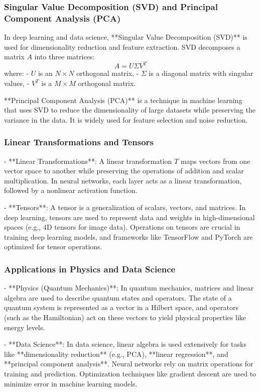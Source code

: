 \documentclass{article}
\begin{document}
\subsubsection*{Singular Value Decomposition (SVD) and Principal Component Analysis (PCA)}

In deep learning and data science, **Singular Value Decomposition (SVD)** is used for dimensionality reduction and feature extraction. SVD decomposes a matrix \( A \) into three matrices:
\[
A = U \Sigma V^T
\]
where:
- \( U \) is an \( N \times N \) orthogonal matrix,
- \( \Sigma \) is a diagonal matrix with singular values,
- \( V^T \) is a \( M \times M \) orthogonal matrix.

**Principal Component Analysis (PCA)** is a technique in machine learning that uses SVD to reduce the dimensionality of large datasets while preserving the variance in the data. It is widely used for feature selection and noise reduction.

\subsubsection*{Linear Transformations and Tensors}

- **Linear Transformations**: A linear transformation \( T \) maps vectors from one vector space to another while preserving the operations of addition and scalar multiplication. In neural networks, each layer acts as a linear transformation, followed by a nonlinear activation function.

- **Tensors**: A tensor is a generalization of scalars, vectors, and matrices. In deep learning, tensors are used to represent data and weights in high-dimensional spaces (e.g., 4D tensors for image data). Operations on tensors are crucial in training deep learning models, and frameworks like TensorFlow and PyTorch are optimized for tensor operations.

\subsubsection*{Applications in Physics and Data Science}

- **Physics (Quantum Mechanics)**: In quantum mechanics, matrices and linear algebra are used to describe quantum states and operators. The state of a quantum system is represented as a vector in a Hilbert space, and operators (such as the Hamiltonian) act on these vectors to yield physical properties like energy levels.

- **Data Science**: In data science, linear algebra is used extensively for tasks like **dimensionality reduction** (e.g., PCA), **linear regression**, and **principal component analysis**. Neural networks rely on matrix operations for training and prediction. Optimization techniques like gradient descent are used to minimize error in machine learning models.
\end{document}
